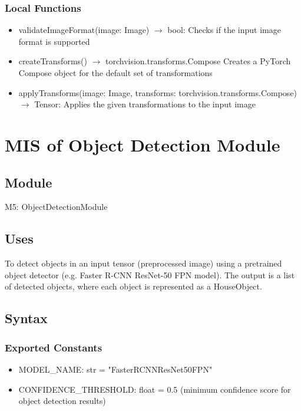 \documentclass[12pt, titlepage]{article}
\begin{document}
\subsubsection{Local Functions}

\begin{itemize}
  \item validateImageFormat(image: Image) $\rightarrow$ bool: Checks if the input image format is supported
  \item createTransforms() $\rightarrow$ torchvision.transforms.Compose\: Creates a PyTorch Compose object for the default set of transformations
  \item applyTransforms(image: Image, transforms: torchvision.transforms.Compose) $\rightarrow$ Tensor: Applies the given transformations to the input image
\end{itemize}

\newpage

\section{MIS of Object Detection Module} \label{Module} 

\subsection{Module}

M5: ObjectDetectionModule

\subsection{Uses}
To detect objects in an input tensor (preprocessed image) using a pretrained object detector (e.g. Faster R-CNN ResNet-50 FPN model). The output is a list of detected objects, where each object is represented as a HouseObject.

\subsection{Syntax}

\subsubsection{Exported Constants}

\begin{itemize}
  \item MODEL{\_}NAME: str = "FasterRCNNResNet50FPN"
  \item CONFIDENCE{\_}THRESHOLD: float = 0.5 (minimum confidence score for object detection results)
\end{itemize}
\end{document}
